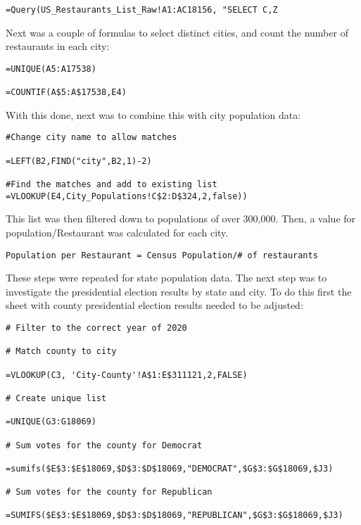 \documentclass[
]{article}
\begin{document}
\begin{verbatim}
=Query(US_Restaurants_List_Raw!A1:AC18156, "SELECT C,Z 
\end{verbatim}

Next was a couple of formulas to select distinct cities, and count the
number of restaurants in each city:

\begin{verbatim}
=UNIQUE(A5:A17538)

=COUNTIF(A$5:A$17538,E4)
\end{verbatim}

With this done, next was to combine this with city population data:

\begin{verbatim}
#Change city name to allow matches

=LEFT(B2,FIND("city",B2,1)-2)

#Find the matches and add to existing list
=VLOOKUP(E4,City_Populations!C$2:D$324,2,false))
\end{verbatim}

This list was then filtered down to populations of over 300,000. Then, a
value for population/Restaurant was calculated for each city.

\begin{verbatim}
Population per Restaurant = Census Population/# of restaurants
\end{verbatim}

These steps were repeated for state population data. The next step was
to investigate the presidential election results by state and city. To
do this first the sheet with county presidential election results needed
to be adjusted:

\begin{verbatim}
# Filter to the correct year of 2020

# Match county to city

=VLOOKUP(C3, 'City-County'!A$1:E$311121,2,FALSE)

# Create unique list

=UNIQUE(G3:G18069)

# Sum votes for the county for Democrat

=sumifs($E$3:$E$18069,$D$3:$D$18069,"DEMOCRAT",$G$3:$G$18069,$J3)

# Sum votes for the county for Republican

=SUMIFS($E$3:$E$18069,$D$3:$D$18069,"REPUBLICAN",$G$3:$G$18069,$J3)
\end{verbatim}
\end{document}

